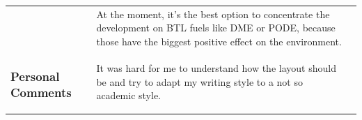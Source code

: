 \begin{xtabular}{|p{3.8cm}|p{8.3cm}|p{4.2cm}|}
 	& 
 	At the moment, it's the best option to concentrate the development on BTL fuels like DME or PODE, because those have the biggest positive effect on the environment.
 	&
 	\\
 	\vspace*{-1.25\baselineskip}\subsubsection{Personal Comments}
 	& 
 	It was hard for me to understand how the layout should be and try to adapt my writing style to a not so academic style.
 	&
 	\\
 	\hline
 \end{xtabular}